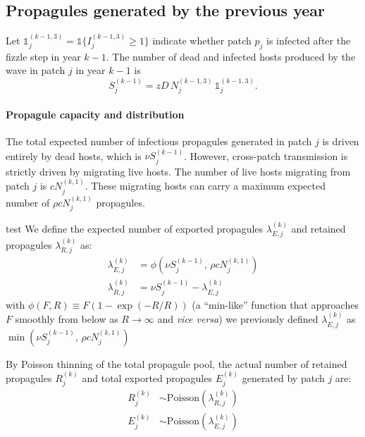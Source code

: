 \documentclass[12pt]{article}
\newcommand{\outdated}[1]{{\color{gray} #1}}
\begin{document}
\subsection{Propagules generated by the previous year}
Let $\mathds{1}_j^{(k-1,3)}=\mathds{1}\{I_j^{(k-1,3)}\ge 1\}$ indicate whether patch $p_j$ is infected after the fizzle step in year $k-1$.
The number of dead and infected hosts produced by the wave in patch $j$ in year $k-1$ is 
\begin{equation}
S_j^{(k-1)} = zD\,N_j^{(k-1,3)}\,\mathds{1}_j^{(k-1,3)}.
\label{eq:Sjk}
\end{equation}

\paragraph{Propagule capacity and distribution}
The total expected number of infectious propagules generated in patch $j$ is driven entirely by dead hosts, which is $\nu S_j^{(k-1)}$. 
However, cross-patch transmission is strictly driven by migrating live hosts. The number of live hosts migrating from patch $j$ is $c N_j^{(k,1)}$. These migrating hosts can carry a maximum expected number of $\rho c N_j^{(k,1)}$ propagules.

\outdated{test}
We define the expected number of exported propagules $\lambda_{E,j}^{(k)}$ and retained propagules $\lambda_{R,j}^{(k)}$ as:
\begin{align}
\lambda_{E,j}^{(k)} & = \phi \left( \nu S_j^{(k-1)}, \, \rho c N_j^{(k,1)} \right)   \label{eq:lambdaE} \\
\lambda_{R,j}^{(k)} &= \nu S_j^{(k-1)} - \lambda_{E,j}^{(k)} \label{eq:lambdaR}
\end{align}
with $\phi(F,R) \equiv F \left( 1- \exp(-R/R) \right)$ (a ``min-like'' function that approaches $F$ smoothly from below as $R \to \infty$ and \emph{vice versa})
\outdated{we previously defined $\lambda_{E,j}^{(k)}$ as $\min\left( \nu S_j^{(k-1)}, \, \rho c N_j^{(k,1)} \right)$}

By Poisson thinning of the total propagule pool, the actual number of retained propagules $R_j^{(k)}$ and total exported propagules $E_j^{(k)}$ generated by patch $j$ are:
\begin{align}
R_j^{(k)} &\sim \mathrm{Poisson}\!\left(\lambda_{R,j}^{(k)}\right) \label{eq:Rjk} \\
E_j^{(k)} &\sim \mathrm{Poisson}\!\left(\lambda_{E,j}^{(k)}\right) \label{eq:Ejk}
\end{align}
\end{document}
